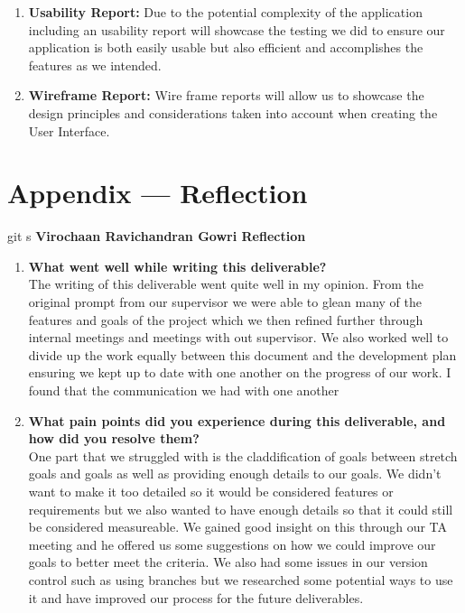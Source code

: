 \documentclass{article}
\begin{document}
\begin{enumerate}
    \item \textbf{Usability Report:} Due to the potential complexity of the application including an usability report will showcase the testing we did to ensure our application is both easily usable but also efficient and accomplishes the features as we intended.
    \item \textbf{Wireframe Report:} Wire frame reports will allow us to showcase the design principles and considerations taken into account when creating the User Interface.
\end{enumerate} 

\newpage{}

\section*{Appendix --- Reflection}


% 
git s
\textbf{Virochaan Ravichandran Gowri Reflection}
\begin{enumerate}
    \item \textbf{What went well while writing this deliverable? } \\
    The writing of this deliverable went quite well in my opinion. From the original prompt from our supervisor we were able to glean many of the features and goals of the project which we then refined further through internal meetings and meetings with out supervisor. We also worked well to divide up the work equally between this document and the development plan ensuring we kept up to date with one another on the progress of our work. I found that the communication we had with one another 
    \item \textbf{What pain points did you experience during this deliverable, and how did you resolve them?} \\ 
    One part that we struggled with is the claddification of goals between stretch goals and goals as well as providing enough details to our goals. We didn't want to make it too detailed so it would be considered features or requirements but we also wanted to have enough details so that it could still be considered measureable. We gained good insight on this through our TA meeting and he offered us some suggestions on how we could improve our goals to better meet the criteria. We also had some issues in our version control such as using branches but we researched some potential ways to use it and have improved our process for the future deliverables.
    
\end{enumerate}  
\end{document}
